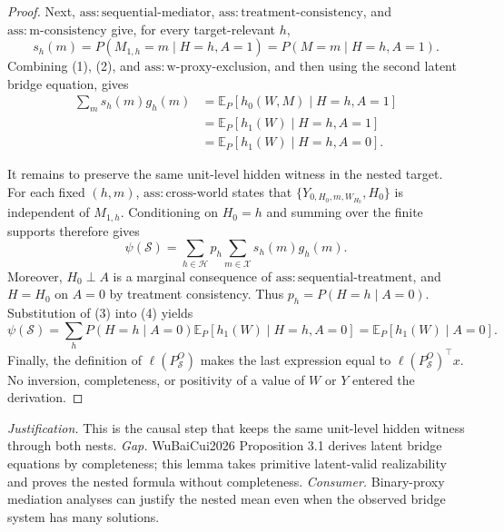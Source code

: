 \documentclass{article}
\begin{document}
\begin{proof}
Next, \(\mathrm{ass{:}sequential\text{-}mediator}\),
\(\mathrm{ass{:}treatment\text{-}consistency}\), and
\(\mathrm{ass{:}m\text{-}consistency}\) give, for every target-relevant \(h\),
\[
 s_h(m)=P(M_{1,h}=m\mid H=h,A=1)=P(M=m\mid H=h,A=1).
 \tag{2}
\]
Combining (1), (2), and
\(\mathrm{ass{:}w\text{-}proxy\text{-}exclusion}\), and then using the second
latent bridge equation, gives
\[
 \begin{aligned}
 \sum_m s_h(m)g_h(m)
 &=\mathbb E_P[h_0(W,M)\mid H=h,A=1]\\
 &=\mathbb E_P[h_1(W)\mid H=h,A=1]\\
 &=\mathbb E_P[h_1(W)\mid H=h,A=0].
 \end{aligned}
 \tag{3}
\]

It remains to preserve the same unit-level hidden witness in the nested target.
For each fixed \((h,m)\), \(\mathrm{ass{:}cross\text{-}world}\) states that
\(\{Y_{0,H_0,m,W_{H_0}},H_0\}\) is independent of \(M_{1,h}\).  Conditioning
on \(H_0=h\) and summing over the finite supports therefore gives
\[
 \psi(\mathcal S)
 =\sum_{h\in\mathcal H}p_h\sum_{m\in\mathcal X}s_h(m)g_h(m).
 \tag{4}
\]
Moreover, \(H_0\perp A\) is a marginal consequence of
\(\mathrm{ass{:}sequential\text{-}treatment}\), and
\(H=H_0\) on \(A=0\) by treatment consistency.  Thus
\(p_h=P(H=h\mid A=0)\).  Substitution of (3) into (4) yields
\[
 \psi(\mathcal S)=\sum_hP(H=h\mid A=0)
 \mathbb E_P[h_1(W)\mid H=h,A=0]
 =\mathbb E_P[h_1(W)\mid A=0].
\]
Finally, the definition of \(\ell(P_{\mathcal S}^O)\) makes the last expression
equal to \(\ell(P_{\mathcal S}^O)^\top x\).  No inversion, completeness, or
positivity of a value of \(W\) or \(Y\) entered the derivation.
\end{proof}
\par\smallskip\noindent \textit{Justification.} This is the causal step that keeps the same unit-level hidden witness through both nests. \textit{Gap.} WuBaiCui2026 Proposition 3.1 derives latent bridge equations by completeness; this lemma takes primitive latent-valid realizability and proves the nested formula without completeness. \textit{Consumer.} Binary-proxy mediation analyses can justify the nested mean even when the observed bridge system has many solutions.
\end{document}
